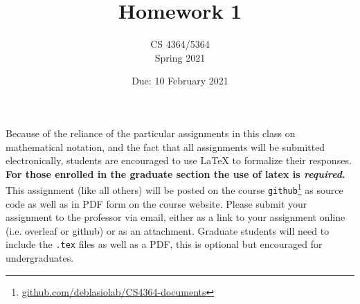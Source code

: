 \documentclass[11pt, oneside]{article}   	%
\title{Homework 1}
\author{CS 4364/5364\\Spring 2021}
\date{Due: 10 February 2021}							%
\begin{document}
\maketitle

Because of the reliance of the particular assignments in this class on mathematical notation, 
and the fact that all assignments will be submitted electronically, 
students are encouraged to use \LaTeX{} to formalize their responses. 
\textbf{For those enrolled in the graduate section the use of latex is \emph{required}.}
This assignment (like all others) will be posted on the course \texttt{github}\footnote{\url{github.com/deblasiolab/CS4364-documents}} as source code as well as in PDF form on the course website. 
Please submit your assignment to the professor via email, either as a link to your assignment online (i.e. overleaf or github) or as an attachment. 
Graduate students will need to include the \texttt{.tex} files as well as a PDF, this is optional but encouraged for undergraduates. 
\end{document}
